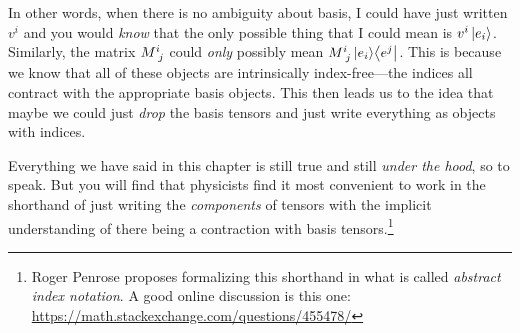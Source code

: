 \documentclass[12pt, oneside]{report}    %
\begin{document}
In other words, when there is no ambiguity about basis, I could have just written $v^i$ and you would \emph{know} that the only possible thing that I could mean is $v^i\left|e_i\right\rangle$. Similarly, the matrix $M\aij{i}{j}$ could \emph{only} possibly mean $M\aij{i}{j}\ket{e_i}\!\bra{e^j}$. This is because we know that all of these objects are intrinsically index-free---the indices all contract with the appropriate basis objects. This then leads us to the idea that maybe we could just \emph{drop} the basis tensors and just write everything as objects with indices.

Everything we have said in this chapter is still true and still \emph{under the hood}, so to speak. But you will find that physicists find it most convenient to work in the shorthand of just writing the \emph{components} of tensors with the implicit understanding of there being a contraction with basis tensors.\footnote{Roger Penrose proposes formalizing this shorthand in what is called \emph{abstract index notation}. A good online discussion is this one: \url{https://math.stackexchange.com/questions/455478/}} 
\end{document}
